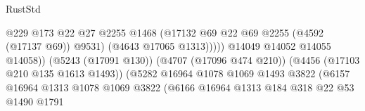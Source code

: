 \begin{lexlean}{RustStd}
\begin{coremodule}
                                                            @229
                                                            @173
                                                            @22
                                                            @27
                                                            @2255
                                                            @1468
                                                            (@17132
                                                              @69
                                                              @22
                                                              @69
                                                              @2255
                                                              (@4592 (@17137 @69))
                                                              @9531)
                                                            (@4643 @17065 @1313)))))
                                                    @14049
                                                    @14052
                                                    @14055
                                                    @14058))
                                                (@5243 (@17091 @130))
                                                (@4707 (@17096 @474 @210))
                                                (@4456 (@17103 @210 @135 @1613 @1493))
                                                (@5282
                                                  @16964
                                                  @1078
                                                  @1069
                                                  @1493
                                                  @3822
                                                  (@6157
                                                    @16964
                                                    @1313
                                                    @1078
                                                    @1069
                                                    @3822
                                                    (@6166
                                                      @16964
                                                      @1313
                                                      @184
                                                      @318
                                                      @22
                                                      @53
                                                      @1490
                                                      @1791

\end{coremodule}
\end{lexlean}

